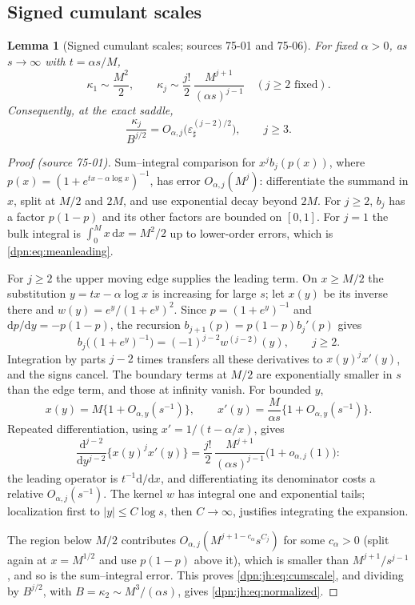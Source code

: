 \documentclass[11pt]{article}
\numberwithin{equation}{section}
\newtheorem{lemma}[theorem]{Lemma}
\theoremstyle{definition}\newtheorem{definition}[theorem]{Definition}
\theoremstyle{remark}\newtheorem{remark}[theorem]{Remark}
\newcommand{\dd}{\,\mathrm d}\newcommand{\ii}{\mathrm i}
\newcommand{\src}[1]{\textup{(source #1)}}
\newcommand{\epsh}{\varepsilon_{\sharp}}
\begin{document}
\subsection{Signed cumulant scales}
\begin{lemma}[Signed cumulant scales; sources 75-01 and 75-06]\label{dpn:jh:lem:cumulants}
For fixed $\alpha>0$, as $s\to\infty$ with $t=\alpha s/M$,
\begin{equation}\label{dpn:jh:eq:cumscale}
 \kappa_1\sim\frac{M^2}{2},\qquad
 \kappa_j\sim\frac{j!}{2}\,\frac{M^{j+1}}{(\alpha s)^{j-1}}\quad(j\ge2\text{ fixed}).
\end{equation}
Consequently, at the exact saddle,
\begin{equation}\label{dpn:jh:eq:normalized}
 \frac{\kappa_j}{B^{j/2}}=O_{\alpha,j}\bigl(\epsh^{(j-2)/2}\bigr),\qquad j\ge3.
\end{equation}
\end{lemma}
\begin{proof}[Proof \src{75-01}]
Sum--integral comparison for $x^jb_j(p(x))$, where
$p(x)=(1+e^{tx-\alpha\log x})^{-1}$, has error $O_{\alpha,j}(M^j)$:
differentiate the summand in $x$, split at $M/2$ and $2M$, and use exponential
decay beyond $2M$.  For $j\ge2$, $b_j$ has a factor $p(1-p)$ and its other
factors are bounded on $[0,1]$.  For $j=1$ the bulk integral is
$\int_0^Mx\dd x=M^2/2$ up to lower-order errors, which is
\eqref{dpn:eq:meanleading}.

For $j\ge2$ the upper moving edge supplies the leading term.  On $x\ge M/2$
the substitution $y=tx-\alpha\log x$ is increasing for large $s$; let $x(y)$
be its inverse there and $w(y)=e^y/(1+e^y)^2$.  Since $p=(1+e^y)^{-1}$ and
$\mathrm dp/\mathrm dy=-p(1-p)$, the recursion
$b_{j+1}(p)=p(1-p)b_j'(p)$ gives
\[
 b_j\bigl((1+e^y)^{-1}\bigr)=(-1)^{j-2}w^{(j-2)}(y),\qquad j\ge2.
\]
Integration by parts $j-2$ times transfers all these derivatives to
$x(y)^jx'(y)$, and the signs cancel.  The boundary terms at $M/2$ are
exponentially smaller in $s$ than the edge term, and those at infinity
vanish.  For bounded $y$,
\[
 x(y)=M\{1+O_{\alpha,y}(s^{-1})\},\qquad
 x'(y)=\frac M{\alpha s}\{1+O_{\alpha,y}(s^{-1})\}.
\]
Repeated differentiation, using $x'=1/(t-\alpha/x)$, gives
\[
 \frac{\mathrm d^{j-2}}{\mathrm dy^{j-2}}\bigl\{x(y)^jx'(y)\bigr\}
 =\frac{j!}{2}\,\frac{M^{j+1}}{(\alpha s)^{j-1}}\bigl(1+o_{\alpha,j}(1)\bigr):
\]
the leading operator is $t^{-1}\mathrm d/\mathrm dx$, and differentiating its
denominator costs a relative $O_{\alpha,j}(s^{-1})$.  The kernel $w$ has
integral one and exponential tails; localization first to $|y|\le C\log s$,
then $C\to\infty$, justifies integrating the expansion.

The region below $M/2$ contributes $O_{\alpha,j}(M^{j+1-c_\alpha}s^{C_j})$ for
some $c_\alpha>0$ (split again at $x=M^{1/2}$ and use $p(1-p)$ above it), which
is smaller than $M^{j+1}/s^{j-1}$, and so is the sum--integral error.  This
proves \eqref{dpn:jh:eq:cumscale}, and dividing by $B^{j/2}$, with
$B=\kappa_2\sim M^3/(\alpha s)$, gives \eqref{dpn:jh:eq:normalized}.
\end{proof}
\end{document}

